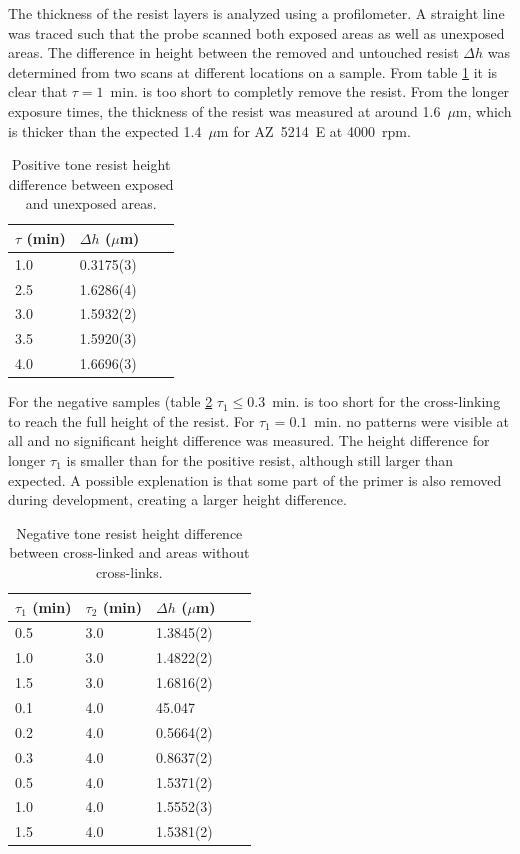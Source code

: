 
The thickness of the resist layers is analyzed using a profilometer. A straight line was traced such that the probe scanned both exposed areas as well as  unexposed areas. The difference in height between the removed and untouched resist $\Delta h$ was determined from two scans at different locations on a sample. From table \ref{tab:pos_profile} it is clear that $\tau = 1$~min. is too short to completly remove the resist. From the longer exposure times, the thickness of the resist was measured at around 1.6~$\mu$m, which is thicker than the expected 1.4~$\mu$m for AZ~5214~E at 4000~rpm.
\begin{table}[H]
    \centering
    \caption{Positive tone resist height difference between exposed and unexposed areas.}
    \begin{tabular}{X l l l}
        $\tau$ (min)& $\Delta h$ ($\mu$m) \\
        \hline\hline
        1.0 & 0.3175(3) \\
        2.5 & 1.6286(4) \\
        3.0 & 1.5932(2) \\
        3.5 & 1.5920(3) \\
        4.0 & 1.6696(3) \\
        \hline
    \end{tabular}
    \label{tab:pos_profile}
\end{table} For the negative samples (table \ref{tab:neg_profile} $\tau_1 \leq 0.3$~min. is too short for the cross-linking to reach the full height of the resist. For $\tau_1 = 0.1$~min. no patterns were visible at all and no significant height difference was measured. The height difference for longer $\tau_1$ is smaller than for the positive resist, although still larger than expected. A possible explenation is that some part of the primer is also removed during development, creating a larger height difference. 
\begin{table}[H]
    \centering
    \caption{Negative tone resist height difference between cross-linked and areas without cross-links.}
    \begin{tabular}{X l l l l}
	$\tau_1$ (min) & $\tau_2$ (min) & $\Delta h$ ($\mu$m) \\
        \hline\hline
        0.5 & 3.0 & 1.3845(2)  \\
        1.0 & 3.0 & 1.4822(2)  \\
        1.5 & 3.0 & 1.6816(2)  \\
        0.1 & 4.0 & 45.047     \\
        0.2 & 4.0 & 0.5664(2)  \\
        0.3 & 4.0 & 0.8637(2)  \\
        0.5 & 4.0 & 1.5371(2)  \\
        1.0 & 4.0 & 1.5552(3)  \\
        1.5 & 4.0 & 1.5381(2)  \\
        \hline
    \end{tabular}
    \label{tab:neg_profile}
\end{table}

